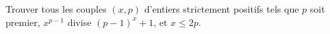Trouver tous les couples $(x, p)$ d'entiers strictement positifs tels que $p$ soit premier, $x^{p-1}$ divise $(p-1)^{x}+1$, et $x \le 2p$.
